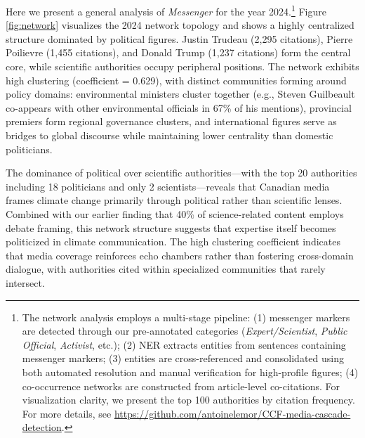 \documentclass[12pt]{article}
\begin{document}
Here we present a general analysis of \emph{Messenger} for the year 2024.\footnote{The network analysis employs a multi-stage pipeline: (1) messenger markers are detected through our pre-annotated categories (\emph{Expert/Scientist}, \emph{Public Official}, \emph{Activist}, etc.); (2) NER extracts entities from sentences containing messenger markers; (3) entities are cross-referenced and consolidated using both automated resolution and manual verification for high-profile figures; (4) co-occurrence networks are constructed from article-level co-citations. For visualization clarity, we present the top 100 authorities by citation frequency. For more details, see \url{https://github.com/antoinelemor/CCF-media-cascade-detection}.} Figure \ref{fig:network} visualizes the 2024 network topology and shows a highly centralized structure dominated by political figures. Justin Trudeau (2,295 citations), Pierre Poilievre (1,455 citations), and Donald Trump (1,237 citations) form the central core, while scientific authorities occupy peripheral positions. The network exhibits high clustering (coefficient = 0.629), with distinct communities forming around policy domains: environmental ministers cluster together (e.g., Steven Guilbeault co-appears with other environmental officials in 67\% of his mentions), provincial premiers form regional governance clusters, and international figures serve as bridges to global discourse while maintaining lower centrality than domestic politicians.

The dominance of political over scientific authorities—with the top 20 authorities including 18 politicians and only 2 scientists—reveals that Canadian media frames climate change primarily through political rather than scientific lenses. Combined with our earlier finding that 40\% of science-related content employs debate framing, this network structure suggests that expertise itself becomes politicized in climate communication. The high clustering coefficient indicates that media coverage reinforces echo chambers rather than fostering cross-domain dialogue, with authorities cited within specialized communities that rarely intersect. 

\appendix
\setcounter{table}{0}  %
\renewcommand{\thetable}{A\arabic{table}}  %
\renewcommand\theHtable{Appendix.\thetable}  %

\landscape
\end{document}
